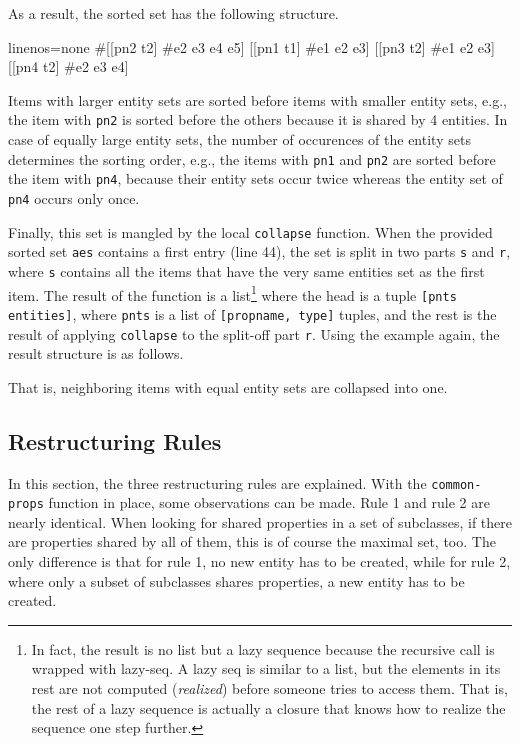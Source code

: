 \documentclass[11pt]{article}
\begin{document}
As a result, the sorted set has the following structure.

\begin{clojurecode*}{linenos=none}
#{[[pn2 t2] #{e2 e3 e4 e5}]
  [[pn1 t1] #{e1 e2 e3}]
  [[pn3 t2] #{e1 e2 e3}]
  [[pn4 t2] #{e2 e3 e4}]}
\end{clojurecode*}

Items with larger entity sets are sorted before items with smaller entity sets,
e.g., the item with \verb|pn2| is sorted before the others because it is shared
by 4 entities.  In case of equally large entity sets, the number of occurences
of the entity sets determines the sorting order, e.g., the items with
\verb|pn1| and \verb|pn2| are sorted before the item with \verb|pn4|, because
their entity sets occur twice whereas the entity set of \verb|pn4| occurs only
once.

Finally, this set is mangled by the local \verb|collapse| function.  When the
provided sorted set \verb|aes| contains a first entry (line 44), the set is
split in two parts \verb|s| and \verb|r|, where \verb|s| contains all the items
that have the very same entities set as the first item.  The result of the
function is a list\footnote{In fact, the result is no list but a lazy sequence
  because the recursive call is wrapped with \textsf{lazy-seq}.  A lazy seq is
  similar to a list, but the elements in its rest are not computed
  (\emph{realized}) before someone tries to access them.  That is, the rest of
  a lazy sequence is actually a closure that knows how to realize the sequence
  one step further.}  where the head is a tuple \verb|[pnts entities]|, where
\verb|pnts| is a list of \verb|[propname, type]| tuples, and the rest is the
result of applying \verb|collapse| to the split-off part \verb|r|.  Using the
example again, the result structure is as follows.

\begin{clojurecode*}{linenos=none}
([([pn2 t2])          #{e2 e3 e4 e5}]
 [([pn1 t1] [pn3 t2]) #{e1 e2 e3}]
 [([pn4 t2])          #{e2 e3 e4}]}
\end{clojurecode*}

That is, neighboring items with equal entity sets are collapsed into one.


\subsection{Restructuring Rules}
\label{sec:restructuring-rules}

In this section, the three restructuring rules are explained.  With the
\verb|common-props| function in place, some observations can be made.  Rule 1
and rule 2 are nearly identical.  When looking for shared properties in a set
of subclasses, if there are properties shared by all of them, this is of course
the maximal set, too.  The only difference is that for rule 1, no new entity
has to be created, while for rule 2, where only a subset of subclasses shares
properties, a new entity has to be created.
\end{document}
